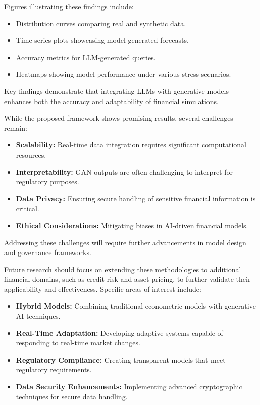 \documentclass[a4paper,12pt]{scrbook}
\begin{document}
	Figures illustrating these findings include:
	
	\begin{itemize}
		\item Distribution curves comparing real and synthetic data.
		\item Time-series plots showcasing model-generated forecasts.
		\item Accuracy metrics for LLM-generated queries.
		\item Heatmaps showing model performance under various stress scenarios.
	\end{itemize}
	
	Key findings demonstrate that integrating LLMs with generative models enhances both the accuracy and adaptability of financial simulations.
	
	
	While the proposed framework shows promising results, several challenges remain:
	
	\begin{itemize}
		\item \textbf{Scalability:} Real-time data integration requires significant computational resources.
		\item \textbf{Interpretability:} GAN outputs are often challenging to interpret for regulatory purposes.
		\item \textbf{Data Privacy:} Ensuring secure handling of sensitive financial information is critical.
		\item \textbf{Ethical Considerations:} Mitigating biases in AI-driven financial models.
	\end{itemize}
	
	Addressing these challenges will require further advancements in model design and governance frameworks.
	
	
	Future research should focus on extending these methodologies to additional financial domains, such as credit risk and asset pricing, to further validate their applicability and effectiveness. Specific areas of interest include:
	
	\begin{itemize}
		\item \textbf{Hybrid Models:} Combining traditional econometric models with generative AI techniques.
		\item \textbf{Real-Time Adaptation:} Developing adaptive systems capable of responding to real-time market changes.
		\item \textbf{Regulatory Compliance:} Creating transparent models that meet regulatory requirements.
		\item \textbf{Data Security Enhancements:} Implementing advanced cryptographic techniques for secure data handling.
	\end{itemize}
	
\end{document}

